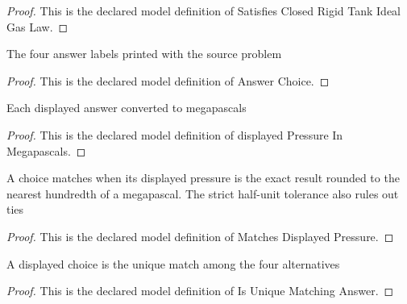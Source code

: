\begin{proof}
  This is the declared model definition of Satisfies Closed Rigid Tank Ideal Gas Law.
\end{proof}
\begin{definition}
  \label{def:physics:phyx-mini-0401:phyxminiproblems-problemphyxmini0401-answerchoice}
  The four answer labels printed with the source problem
\end{definition}
\begin{proof}
  This is the declared model definition of Answer Choice.
\end{proof}
\begin{definition}
  \label{def:physics:phyx-mini-0401:phyxminiproblems-problemphyxmini0401-displayedpressureinmegapascals}
  Each displayed answer converted to megapascals
\end{definition}
\begin{proof}
  This is the declared model definition of displayed Pressure In Megapascals.
\end{proof}
\begin{definition}
  \label{def:physics:phyx-mini-0401:phyxminiproblems-problemphyxmini0401-matchesdisplayedpressure}
  A choice matches when its displayed pressure is the exact result rounded to the nearest hundredth of a megapascal. The strict half-unit tolerance also rules out ties
\end{definition}
\begin{proof}
  This is the declared model definition of Matches Displayed Pressure.
\end{proof}
\begin{definition}
  \label{def:physics:phyx-mini-0401:phyxminiproblems-problemphyxmini0401-isuniquematchinganswer}
  A displayed choice is the unique match among the four alternatives
\end{definition}
\begin{proof}
  This is the declared model definition of Is Unique Matching Answer.
\end{proof}
